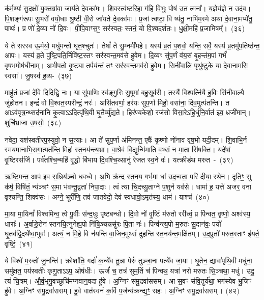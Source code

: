 क॑र्म॒ण्यः॑ सु॒दक्षो॑ यु॒क्तग्रा॑वा॒ जाय॑ते दे॒वका॑मः। शि॒वस्त्व॑ष्टरि॒हा ग॑हि वि॒भुः पोष॑ उ॒त त्मना᳚। य॒ज्ञेय॑ज्ञे न॒ उद॑व। पि॒शङ्ग॑रूपः सु॒भरो॑ वयो॒धाः श्रु॒ष्टी वी॒रो जा॑यते दे॒वका॑मः। प्र॒जां त्वष्टा॒ वि ष्य॑तु॒ नाभि॑म॒स्मे अथा॑ दे॒वाना॒मप्ये॑तु॒ पाथः॑। प्र णो॑ दे॒व्या नो॑ दि॒वः। पी॒पि॒वाꣳस॒ꣳ॒ सर॑स्वतः॒ स्तनं॒ यो वि॒श्वद॑र्\mbox{}शतः। धु॒क्षी॒महि॑ प्र॒जामिषम्᳚।~(३६)\ip

ये ते॑ सरस्व ऊ॒र्मयो॒ मधु॑मन्तो घृत॒श्चुतः॑। तेषां᳚ ते सु॒म्नमी॑महे। यस्य॑ व्र॒तं प॒शवो॒ यन्ति॒ सर्वे॒ यस्य॑ व्र॒तमु॑प॒तिष्ठ॑न्त॒ आपः॑। यस्य॑ व्र॒ते पु॑ष्टि॒पति॒र्निवि॑ष्ट॒स्तꣳ सर॑स्वन्त॒मव॑से हुवेम। दि॒व्यꣳ सु॑प॒र्णं व॑य॒सं बृ॒हन्त॑म॒पां गर्भं॑ वृष॒भमोष॑धीनाम्। अ॒भी॒प॒तो वृ॒ष्ट्या त॒र्पय॑न्तं॒ तꣳ सर॑स्वन्त॒मव॑से हुवेम। सिनी॑वालि॒ पृथु॑ष्टुके॒ या दे॒वाना॒मसि॒ स्वसा᳚। जु॒षस्व॑ ह॒व्य-~(३७)\ip

माहु॑तं प्र॒जां दे॑वि दिदिड्ढि नः। या सु॑पा॒णिः स्व॑ङ्गु॒रिः सु॒षूमा॑ बहु॒सूव॑री। तस्यै॑ वि॒श्पत्नि॑यै ह॒विः सि॑नीवा॒ल्यै जु॑होतन। इन्द्रं॑ वो वि॒श्वत॒स्परीन्द्रं॒ नरः॑। असि॑तवर्णा॒ हर॑यः सुप॒र्णा मिहो॒ वसा॑ना॒ दिव॒मुत्प॑तन्ति। त आ\-ऽव॑वृत्र॒न्थ्सद॑नानि कृ॒त्वा\-ऽऽ\-दित्पृ॑थि॒वी घृ॒तैर्व्यु॑द्यते। हिर॑ण्यकेशो॒ रज॑सो विसा॒रे\-ऽहि॒र्धुनि॒र्वात॑ इव॒ ध्रजी॑\-मान्। शुचि॑भ्राजा उ॒षसो॒~(३८)\ip

नवे॑दा॒ यश॑स्वतीरप॒स्युवो॒ न स॒त्याः। आ ते॑ सुप॒र्णा अ॑मिनन्त॒ एवैः᳚ कृ॒ष्णो नो॑नाव वृष॒भो यदी॒दम्। शि॒वाभि॒र्न स्मय॑\-माना\-भि॒रागा॒त्पत॑न्ति॒ मिहः॑ स्त॒नय॑न्त्य॒भ्रा। वा॒श्रेव॑ वि॒द्युन्मि॑माति व॒थ्सं न मा॒ता सि॑षक्ति। यदे॑षां वृ॒ष्टिरस॑र्जि। पर्व॑तश्चि॒न्महि॑ वृ॒द्धो बि॑भाय दि॒वश्चि॒थ्सानु॑ रेजत स्व॒ने वः॑। यत्क्रीड॑थ मरुत~-~(३९)\ip

ऋष्टि॒मन्त॒ आप॑ इव स॒ध्रिय॑ञ्चो धवध्वे। अ॒भि क्र॑न्द स्त॒नय॒ गर्भ॒मा धा॑ उद॒न्वता॒ परि॑ दीया॒ रथे॑न। दृति॒ꣳ॒ सु क॑र्\mbox{}ष॒ विषि॑तं॒ न्य॑ञ्चꣳ स॒मा भ॑वन्तू॒द्वता॑ निपा॒दाः। त्वं त्या चि॒दच्यु॒ताग्ने॑ प॒शुर्न यव॑से। धामा॑ ह॒ यत्ते॑ अजर॒ वना॑ वृ॒श्चन्ति॒ शिक्व॑सः। अग्ने॒ भूरी॑णि॒ तव॑ जातवेदो॒ देव॑ स्वधावो॒\-ऽमृत॑स्य॒ धाम॑। याश्च॑~(४०)\ip

मा॒या मा॒यिनां᳚ विश्वमिन्व॒ त्वे पू॒र्वीः स॑न्द॒धुः पृ॑ष्टबन्धो। दि॒वो नो॑ वृ॒ष्टिं म॑रुतो ररीध्वं॒ प्र पि॑न्वत॒ वृष्णो॒ अश्व॑स्य॒ धाराः᳚। अ॒र्वाङे॒तेन॑ स्तनयि॒त्नुनेह्य॒पो नि॑षि॒ञ्चन्नसु॑रः पि॒ता नः॑। पिन्व॑न्त्य॒पो म॒रुतः॑ सु॒\-दान॑वः॒ पयो॑ घृ॒तव॑द्वि॒दथे᳚ष्वा॒भुवः॑। अत्यं॒ न मि॒हे वि न॑यन्ति वा॒जिन॒\-मुथ्सं॑ दुहन्ति स्त॒नय॑न्त॒मक्षि॑तम्। उ॒द॒प्रुतो॑ मरुत॒स्ताꣳ इ॑यर्त॒ वृष्टिं॒~(४१)\ip

ये विश्वे॑ म॒रुतो॑ जु॒नन्ति॑। क्रोशा॑ति॒ गर्दा॑ क॒न्ये॑व तु॒न्ना पेरुं॑ तुञ्जा॒ना पत्ये॑व जा॒या। घृ॒तेन॒ द्यावा॑\-पृथि॒वी मधु॑ना॒ समु॑क्षत॒ पय॑स्वतीः कृणु॒ता\-ऽऽ\-प॒ ओष॑धीः। ऊर्जं॑ च॒ तत्र॑ सुम॒तिं च॑ पिन्वथ॒ यत्रा॑ नरो मरुतः सि॒ञ्चथा॒ मधु॑। उदु॒ त्यं चि॒त्रम्। औ॒र्व॒भृ॒गु॒वच्छुचि॑मप्नवान॒वदा हु॑वे। अ॒ग्निꣳ स॑मु॒द्रवा॑ससम्। आ स॒वꣳ स॑वि॒तुर्य॑था॒ भग॑स्येव भु॒जिꣳ हु॑वे। अ॒ग्निꣳ स॑मु॒द्रवा॑ससम्। हु॒वे वात॑स्वनं क॒विं प॒र्जन्य॑क्रन्द्य॒ꣳ॒ सहः॑। अ॒ग्निꣳ स॑मु॒द्रवा॑ससम्॥~(४२)\ip


